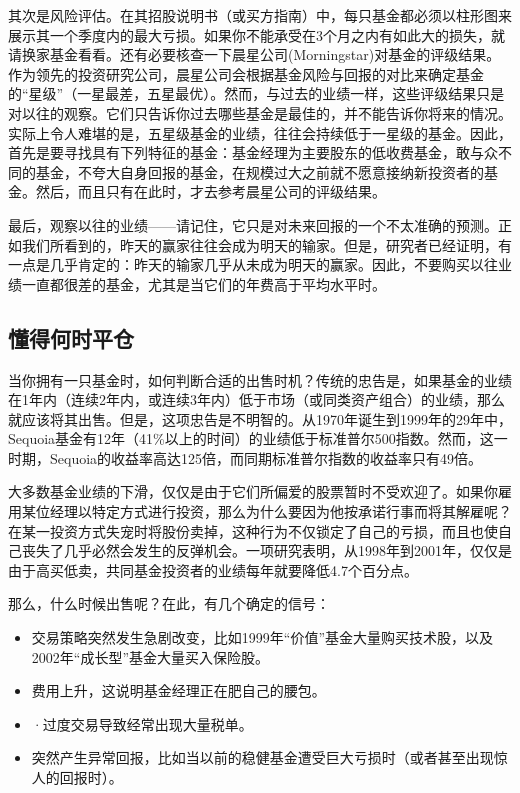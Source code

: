 \documentclass[12pt,oneside]{book}
\begin{document}
其次是风险评估。在其招股说明书（或买方指南）中，每只基金都必须以柱形图来展示其一个季度内的最大亏损。如果你不能承受在3个月之内有如此大的损失，就请换家基金看看。还有必要核查一下晨星公司(Morningstar)对基金的评级结果。作为领先的投资研究公司，晨星公司会根据基金风险与回报的对比来确定基金的“星级”（一星最差，五星最优）。然而，与过去的业绩一样，这些评级结果只是对以往的观察。它们只告诉你过去哪些基金是最佳的，并不能告诉你将来的情况。实际上令人难堪的是，五星级基金的业绩，往往会持续低于一星级的基金。因此，首先是要寻找具有下列特征的基金：基金经理为主要股东的低收费基金，敢与众不同的基金，不夸大自身回报的基金，在规模过大之前就不愿意接纳新投资者的基金。然后，而且只有在此时，才去参考晨星公司的评级结果。

最后，观察以往的业绩——请记住，它只是对未来回报的一个不太准确的预测。正如我们所看到的，昨天的赢家往往会成为明天的输家。但是，研究者已经证明，有一点是几乎肯定的：昨天的输家几乎从未成为明天的赢家。因此，不要购买以往业绩一直都很差的基金，尤其是当它们的年费高于平均水平时。


\subsection{懂得何时平仓}
当你拥有一只基金时，如何判断合适的出售时机？传统的忠告是，如果基金的业绩在1年内（连续2年内，或连续3年内）低于市场（或同类资产组合）的业绩，那么就应该将其出售。但是，这项忠告是不明智的。从1970年诞生到1999年的29年中，Sequoia基金有12年（41\%以上的时间）的业绩低于标准普尔500指数。然而，这一时期，Sequoia的收益率高达125倍，而同期标准普尔指数的收益率只有49倍。

大多数基金业绩的下滑，仅仅是由于它们所偏爱的股票暂时不受欢迎了。如果你雇用某位经理以特定方式进行投资，那么为什么要因为他按承诺行事而将其解雇呢？在某一投资方式失宠时将股份卖掉，这种行为不仅锁定了自己的亏损，而且也使自己丧失了几乎必然会发生的反弹机会。一项研究表明，从1998年到2001年，仅仅是由于高买低卖，共同基金投资者的业绩每年就要降低4.7个百分点。

那么，什么时候出售呢？在此，有几个确定的信号：

\begin{itemize}
\item 交易策略突然发生急剧改变，比如1999年“价值”基金大量购买技术股，以及2002年“成长型”基金大量买入保险股。
\item 费用上升，这说明基金经理正在肥自己的腰包。
\item ·过度交易导致经常出现大量税单。
\item 突然产生异常回报，比如当以前的稳健基金遭受巨大亏损时（或者甚至出现惊人的回报时）。

\end{itemize}
\end{document}
